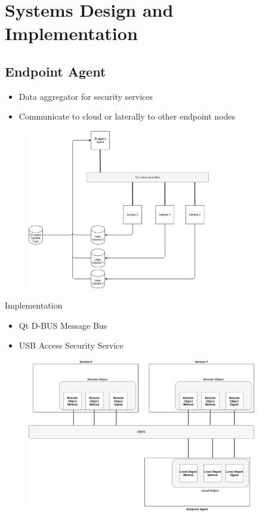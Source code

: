 \section{Systems Design and Implementation}
\subsection{Endpoint Agent}
\begin{frame}{\insertsubsection}
    \begin{itemize}
        \item Data aggregator for security services
        \item Communicate to cloud or laterally to other endpoint nodes
   \end{itemize}
    
    \begin{figure}[h]
        \centering
        \includegraphics[width=8cm]{img/endpoint_agent_design-pp1.png}
        \label{fig:endpoint_agent_overview}
    \end{figure}
\end{frame}

\begin{frame}{Implementation}
    \begin{itemize}
        \item Qt D-BUS Message Bus
        \item USB Access Security Service
    \end{itemize}
    
    \begin{figure}[h]
        \centering
        \includegraphics[width=10cm]{img/endpoint_agent_dbus_pp2.png}
        \label{fig:endpoint_agent_dbus}
    \end{figure}
\end{frame}

